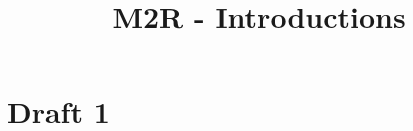 \documentclass{article}
\title{M2R - Introductions}
\begin{document}
\maketitle

\section{Draft 1}
\label{sec:1}



\clearpage
\printbibliography
\end{document}

